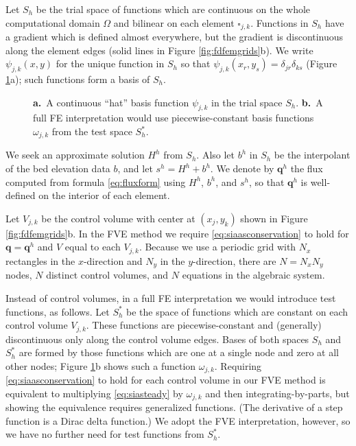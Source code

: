 \documentclass[review,letterpaper]{igs}
\newcommand\bq{\mathbf{q}}
\begin{document}
Let $S_h$ be the trial space of functions which are continuous on the whole computational domain $\Omega$ and bilinear on each element $\square_{j,k}$.  Functions in $S_h$ have a gradient which is defined almost everywhere, but the gradient is discontinuous along the element edges (solid lines in Figure \ref{fig:fdfemgrids}b).  We write $\psi_{j,k}(x,y)$ for the unique function in $S_h$ so that $\psi_{j,k}(x_r,y_s) = \delta_{jr} \delta_{ks}$ (Figure \ref{fig:fembases}a); such functions form a basis of $S_h$.

\begin{figure}[ht]
\begin{center}
 \quad 
\end{center}
\caption{\textbf{a.}~A continuous ``hat'' basis function $\psi_{j,k}$ in the trial space $S_h$.  \textbf{b.}~A full FE interpretation would use piecewise-constant basis functions $\omega_{j,k}$ from the test space $S_h^*$.}
\label{fig:fembases}
\end{figure}

We seek an approximate solution $H^h$ from $S_h$.  Also let $b^h$ in $S_h$ be the interpolant of the bed elevation data $b$, and let $s^h=H^h+b^h$.  We denote by $\bq^h$ the flux computed from formula \eqref{eq:fluxform} using $H^h$, $b^h$, and $s^h$, so that $\bq^h$ is well-defined on the interior of each element.

Let $V_{j,k}$ be the control volume with center at $(x_j,y_k)$ shown in Figure \ref{fig:fdfemgrids}b.  In the FVE method we require \eqref{eq:siaasconservation} to hold for $\bq=\bq^h$ and $V$ equal to each $V_{j,k}$.  Because we use a periodic grid with $N_x$ rectangles in the $x$-direction and $N_y$ in the $y$-direction, there are $N=N_xN_y$ nodes, $N$ distinct control volumes, and $N$ equations in the algebraic system.

Instead of control volumes, in a full FE interpretation we would introduce test functions, as follows.  Let $S_h^*$ be the space of functions which are constant on each control volume $V_{j,k}$.  These functions are piecewise-constant and (generally) discontinuous only along the control volume edges.  Bases of both spaces $S_h$ and $S_h^*$ are formed by those functions which are one at a single node and zero at all other nodes; Figure \ref{fig:fembases}b shows such a function $\omega_{j,k}$.  Requiring \eqref{eq:siaasconservation} to hold for each control volume in our FVE method is equivalent to multiplying \eqref{eq:siasteady} by $\omega_{j,k}$ and then integrating-by-parts, but showing the equivalence requires generalized functions.  (The derivative of a step function is a Dirac delta function.)  We adopt the FVE interpretation, however, so we have no further need for test functions from $S_h^*$.
\end{document}
